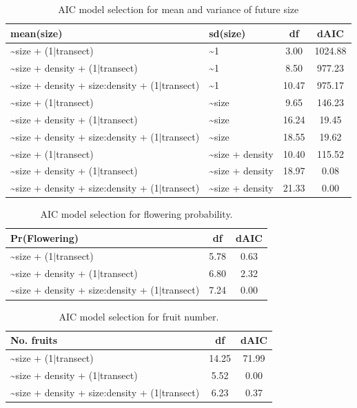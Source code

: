 \documentclass[11pt]{article}\usepackage[]{graphicx}\usepackage[]{color}
\begin{document}
\begin{table}[ht]
\centering
\begin{tabular}{|p{8cm}|p{4cm}|c|c|}
  \hline
mean(size) & sd(size) & df & dAIC \\ 
  \hline
\~{}size + (1$|$transect) & \~{}1 & 3.00 & 1024.88 \\ 
  \~{}size + density + (1$|$transect) & \~{}1 & 8.50 & 977.23 \\ 
  \~{}size + density + size:density + (1$|$transect) & \~{}1 & 10.47 & 975.17 \\ 
  \~{}size + (1$|$transect) & \~{}size & 9.65 & 146.23 \\ 
  \~{}size + density + (1$|$transect) & \~{}size & 16.24 & 19.45 \\ 
  \~{}size + density + size:density + (1$|$transect) & \~{}size & 18.55 & 19.62 \\ 
  \~{}size + (1$|$transect) & \~{}size + density & 10.40 & 115.52 \\ 
  \~{}size + density + (1$|$transect) & \~{}size + density & 18.97 & 0.08 \\ 
  \~{}size + density + size:density + (1$|$transect) & \~{}size + density & 21.33 & 0.00 \\ 
   \hline
\end{tabular}
\caption{AIC model selection for mean and variance of future size} 
\label{tab:grow_aic}
\end{table}



\begin{table}[ht]
\centering
\begin{tabular}{|p{8cm}|c|c|}
  \hline
Pr(Flowering) & df & dAIC \\ 
  \hline
\~{}size + (1$|$transect) & 5.78 & 0.63 \\ 
  \~{}size + density + (1$|$transect) & 6.80 & 2.32 \\ 
  \~{}size + density + size:density + (1$|$transect) & 7.24 & 0.00 \\ 
   \hline
\end{tabular}
\caption{AIC model selection for flowering probability.} 
\label{tab:flow_aic}
\end{table}



\begin{table}[ht]
\centering
\begin{tabular}{|p{8cm}|c|c|}
  \hline
No. fruits & df & dAIC \\ 
  \hline
\~{}size + (1$|$transect) & 14.25 & 71.99 \\ 
  \~{}size + density + (1$|$transect) & 5.52 & 0.00 \\ 
  \~{}size + density + size:density + (1$|$transect) & 6.23 & 0.37 \\ 
   \hline
\end{tabular}
\caption{AIC model selection for fruit number.} 
\label{tab:fruit_aic}
\end{table}
\end{document}
